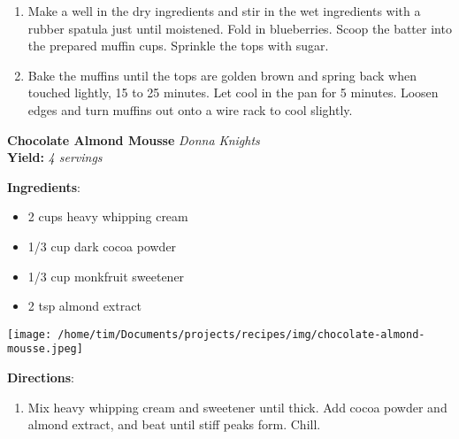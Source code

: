 \documentclass[11pt, twoside, openany]{book}
\begin{document}
\begin{minipage}[t]{\linewidth}
\begin{enumerate}
\item Make a well in the dry ingredients and stir in the wet ingredients with a rubber spatula just until moistened. Fold in blueberries. Scoop the batter into the prepared muffin cups. Sprinkle the tops with sugar.
\item Bake the muffins until the tops are golden brown and spring back when touched lightly, 15 to 25 minutes. Let cool in the pan for 5 minutes. Loosen edges and turn muffins out onto a wire rack to cool slightly.
\end{enumerate}
\end{minipage}\vspace{8mm}
\noindent\begin{minipage}[t]{\linewidth}%
{\Large\textbf{Chocolate Almond Mousse}} \label{chocolate-almond-mousse}\hfill\textit{Donna Knights}\\
\textbf{Yield:} \textit{4 servings}\\
\noindent\begin{minipage}[t]{0.78\linewidth}%
\textbf{Ingredients}:\vspace{-3mm}
\begin{multicols}{2}
\begin{itemize}\setlength\itemsep{-1mm}
\item 2 cups heavy whipping cream
\item 1/3 cup dark cocoa powder
\item 1/3 cup monkfruit sweetener
\item 2 tsp almond extract
\end{itemize}
\end{multicols}
\end{minipage}
\noindent\begin{minipage}[t]{0.18\linewidth}
\centering \strut\vspace*{-\baselineskip}\newline
\texttt{[image: /home/tim/Documents/projects/recipes/img/chocolate-almond-mousse.jpeg]}\\
\end{minipage}\vspace{3mm}
\textbf{Directions}:
\vspace{-3mm}\begin{enumerate}\setlength\itemsep{-1mm}
\item Mix heavy whipping cream and sweetener until thick. Add cocoa powder and almond extract, and beat until stiff peaks form. Chill.
\end{enumerate}
\end{minipage}\vspace{8mm}
\end{document}
